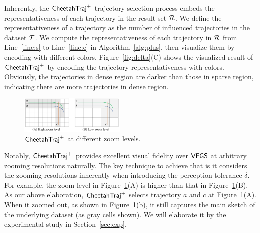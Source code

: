 Inherently, the $\mathsf{CheetahTraj}^{+}$ trajectory selection process embeds the representativeness of each trajectory in the result set $\mathcal{R}$.
We define the representativeness of a trajectory as the number of influenced trajectories in the dataset $\mathcal{T}$.
We compute the representativeness of each trajectory in $\mathcal{R}$ from Line~\ref{line:s} to Line~\ref{line:e} in Algorithm~\ref{alg:plus}, then visualize them by encoding with different colors.
Figure~\ref{fig:delta}(C) shows the visualized result of $\mathsf{CheetahTraj}^{+}$ by encoding the trajectory representativeness with colors.
Obviously, the trajectories in dense region are darker than those in sparse region, indicating there are more trajectories in dense region.

\begin{figure}[t]
	\centering
	\includegraphics[width=0.45\textwidth]{pictures/problemsolveing/one_to_many.pdf}
	\vspace{-2mm}
	\caption{$\mathsf{CheetahTraj}^{+}$ at different zoom levels.}	\label{fig:zoom} %
    \vspace{-2mm}
\end{figure}


Notably, $\mathsf{CheetahTraj}^{+}$ provides excellent visual fidelity over $\mathsf{VFGS}$ at arbitrary zooming resolutions naturally.
The key technique to achieve that is it considers the zooming resolutions inherently when introducing the perception tolerance $\delta$.
For example, the zoom level in Figure~\ref{fig:zoom}(A) is higher than that in Figure~\ref{fig:zoom}(B).
As our above elaboration, $\mathsf{CheetahTraj}^{+}$ selects trajectory $a$ and $c$ at Figure~\ref{fig:zoom}(A).
When it zoomed out, as shown in Figure~\ref{fig:zoom}(b), it still captures the main sketch of the underlying dataset (as gray cells shown).
We will elaborate it by the experimental study in Section~\ref{sec:exp}.







